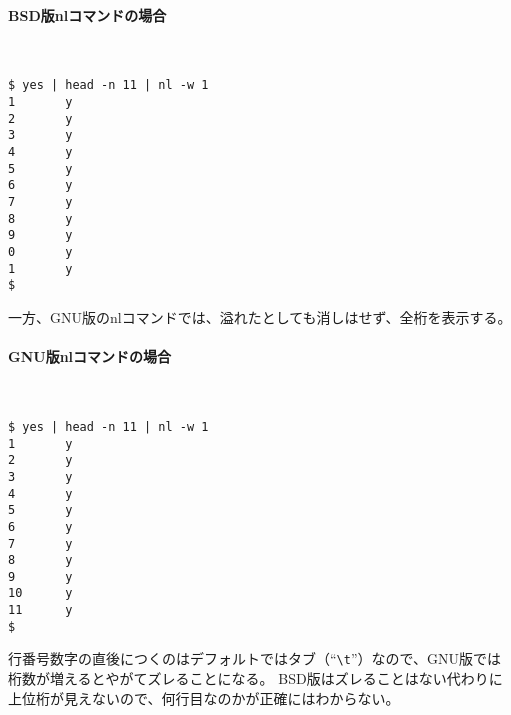 \paragraph{BSD版nlコマンドの場合} 　\\
\begin{screen}
	\verb!$ yes | head -n 11 | nl -w 1! \return \\
	\verb|1       y| \\
	\verb|2       y| \\
	\verb|3       y| \\
	\verb|4       y| \\
	\verb|5       y| \\
	\verb|6       y| \\
	\verb|7       y| \\
	\verb|8       y| \\
	\verb|9       y| \\
	\verb|0       y| \\
	\verb|1       y| \\
	\verb|$ |
\end{screen}

一方、GNU版のnlコマンドでは、溢れたとしても消しはせず、全桁を表示する。

\paragraph{GNU版nlコマンドの場合} 　\\
\begin{screen}
	\verb!$ yes | head -n 11 | nl -w 1! \return \\
	\verb|1       y| \\
	\verb|2       y| \\
	\verb|3       y| \\
	\verb|4       y| \\
	\verb|5       y| \\
	\verb|6       y| \\
	\verb|7       y| \\
	\verb|8       y| \\
	\verb|9       y| \\
	\verb|10      y| \\
	\verb|11      y| \\
	\verb|$ |
\end{screen}

行番号数字の直後につくのはデフォルトではタブ（``\verb|\t|''）なので、GNU版では桁数が増えるとやがてズレることになる。
BSD版はズレることはない代わりに上位桁が見えないので、何行目なのかが正確にはわからない。

